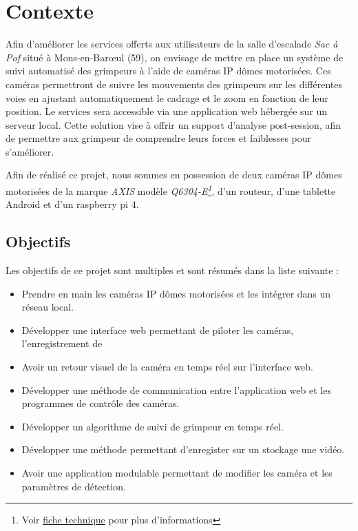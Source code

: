 \documentclass[a4paper, 11pt, french]{article}
\newcounter{obj}
\begin{document}

\setcounter{secnumdepth}{3}
\setcounter{tocdepth}{3}
\startcontents[sections]

\tableofcontents
\newpage


\section{Contexte}
Afin d'améliorer les services offerts aux utilisateurs de la salle d’escalade \textit{Sac à Pof} situé à  Mons-en-Barœul (59), on envisage de mettre en place un système de suivi automatisé des grimpeurs à l'aide de caméras IP dômes motorisées. Ces caméras permettront de suivre les mouvements des grimpeurs sur les différentes voies en ajustant automatiquement le cadrage et le zoom en fonction de leur position. Le services sera accessible via une application web hébergée sur un serveur local. Cette solution vise à offrir un support d'analyse post-session, afin de permettre aux grimpeur de comprendre leurs forces et faiblesses pour s'améliorer.

Afin de réalisé ce projet, nous sommes en possession de deux caméras IP dômes motorisées de la marque \textit{AXIS} modèle \textit{Q6304-E\footnote{Voir \href{https://www.axis.com/dam/public/11/e4/20/cam\%C3\%A9ra-r\%C3\%A9seau-\%C3\%A0-d\%C3\%B4me-ptz-axis-q6034-e-fr-FR-201515.pdf}{fiche technique} pour plus d'informations}}, d'un routeur, d'une tablette Android et d'un raspberry pi 4.

\subsection{Objectifs}
Les objectifs de ce projet sont multiples et sont résumés dans la liste suivante :
\begin{itemize}
  \item Prendre en main les caméras IP dômes motorisées et les intégrer dans un réseau local.
  \item Développer une interface web permettant de piloter les caméras, l'enregistrement de  \item Avoir un retour visuel de la caméra en temps réel sur l'interface web.
  \item Développer une méthode de communication entre l'application web et les programmes de contrôle des caméras.
  \item Développer un algorithme de suivi de grimpeur en temps réel.
  \item Développer une méthode permettant d'enregister sur un stockage une vidéo.
  \item Avoir une application modulable permettant de modifier les caméra et les paramètres de détection.
\end{itemize}
\end{document}
